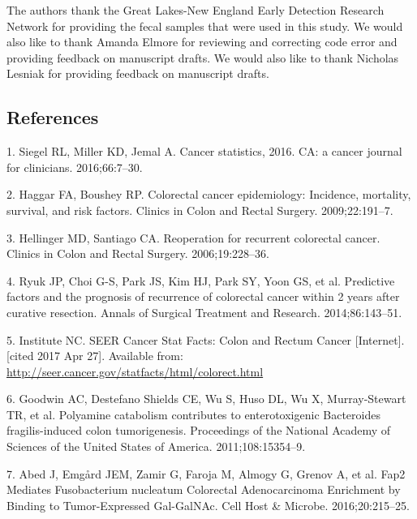\documentclass[12pt,]{article}
\begin{document}
The authors thank the Great Lakes-New England Early Detection Research
Network for providing the fecal samples that were used in this study. We
would also like to thank Amanda Elmore for reviewing and correcting code
error and providing feedback on manuscript drafts. We would also like to
thank Nicholas Lesniak for providing feedback on manuscript drafts.

\newpage

\subsection*{References}\label{references}

\hypertarget{refs}{}
\hypertarget{ref-siegel_cancer_2016}{}
1. Siegel RL, Miller KD, Jemal A. Cancer statistics, 2016. CA: a cancer
journal for clinicians. 2016;66:7--30.

\hypertarget{ref-haggar_colorectal_2009}{}
2. Haggar FA, Boushey RP. Colorectal cancer epidemiology: Incidence,
mortality, survival, and risk factors. Clinics in Colon and Rectal
Surgery. 2009;22:191--7.

\hypertarget{ref-hellinger_reoperation_2006}{}
3. Hellinger MD, Santiago CA. Reoperation for recurrent colorectal
cancer. Clinics in Colon and Rectal Surgery. 2006;19:228--36.

\hypertarget{ref-ryuk_predictive_2014}{}
4. Ryuk JP, Choi G-S, Park JS, Kim HJ, Park SY, Yoon GS, et al.
Predictive factors and the prognosis of recurrence of colorectal cancer
within 2 years after curative resection. Annals of Surgical Treatment
and Research. 2014;86:143--51.

\hypertarget{ref-national_cancer_institute_seer_nodate}{}
5. Institute NC. SEER Cancer Stat Facts: Colon and Rectum Cancer
{[}Internet{]}. {[}cited 2017 Apr 27{]}. Available from:
\url{http://seer.cancer.gov/statfacts/html/colorect.html}

\hypertarget{ref-goodwin_polyamine_2011}{}
6. Goodwin AC, Destefano Shields CE, Wu S, Huso DL, Wu X, Murray-Stewart
TR, et al. Polyamine catabolism contributes to enterotoxigenic
Bacteroides fragilis-induced colon tumorigenesis. Proceedings of the
National Academy of Sciences of the United States of America.
2011;108:15354--9.

\hypertarget{ref-abed_fap2_2016}{}
7. Abed J, Emgård JEM, Zamir G, Faroja M, Almogy G, Grenov A, et al.
Fap2 Mediates Fusobacterium nucleatum Colorectal Adenocarcinoma
Enrichment by Binding to Tumor-Expressed Gal-GalNAc. Cell Host \&
Microbe. 2016;20:215--25.
\end{document}
